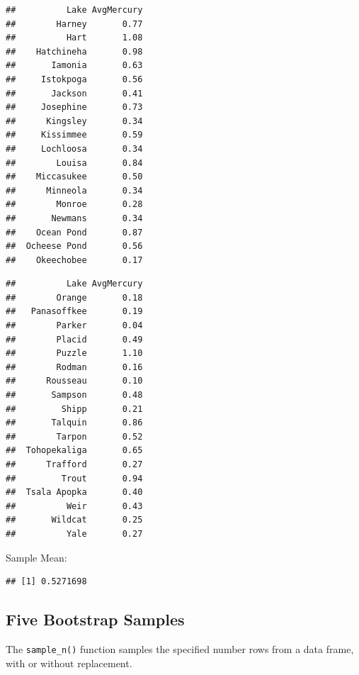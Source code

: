 \documentclass[]{book}
\newenvironment{Shaded}{\begin{snugshade}}{\end{snugshade}}
\newcommand{\KeywordTok}[1]{\textcolor[rgb]{0.13,0.29,0.53}{\textbf{#1}}}
\newcommand{\DataTypeTok}[1]{\textcolor[rgb]{0.13,0.29,0.53}{#1}}
\newcommand{\DecValTok}[1]{\textcolor[rgb]{0.00,0.00,0.81}{#1}}
\newcommand{\StringTok}[1]{\textcolor[rgb]{0.31,0.60,0.02}{#1}}
\newcommand{\OtherTok}[1]{\textcolor[rgb]{0.56,0.35,0.01}{#1}}
\newcommand{\OperatorTok}[1]{\textcolor[rgb]{0.81,0.36,0.00}{\textbf{#1}}}
\newcommand{\NormalTok}[1]{#1}
\begin{document}
\begin{verbatim}
##          Lake AvgMercury
##        Harney       0.77
##          Hart       1.08
##    Hatchineha       0.98
##       Iamonia       0.63
##     Istokpoga       0.56
##       Jackson       0.41
##     Josephine       0.73
##      Kingsley       0.34
##     Kissimmee       0.59
##     Lochloosa       0.34
##        Louisa       0.84
##    Miccasukee       0.50
##      Minneola       0.34
##        Monroe       0.28
##       Newmans       0.34
##    Ocean Pond       0.87
##  Ocheese Pond       0.56
##    Okeechobee       0.17
\end{verbatim}

\begin{verbatim}
##          Lake AvgMercury
##        Orange       0.18
##   Panasoffkee       0.19
##        Parker       0.04
##        Placid       0.49
##        Puzzle       1.10
##        Rodman       0.16
##      Rousseau       0.10
##       Sampson       0.48
##         Shipp       0.21
##       Talquin       0.86
##        Tarpon       0.52
##  Tohopekaliga       0.65
##      Trafford       0.27
##         Trout       0.94
##  Tsala Apopka       0.40
##          Weir       0.43
##       Wildcat       0.25
##          Yale       0.27
\end{verbatim}

Sample Mean:

\begin{Shaded}
\end{Shaded}

\begin{verbatim}
## [1] 0.5271698
\end{verbatim}

\subsection{Five Bootstrap Samples}\label{five-bootstrap-samples}

The \texttt{sample\_n()} function samples the specified number rows from
a data frame, with or without replacement.

\begin{Shaded}
\end{Shaded}
\end{document}

